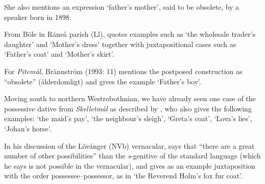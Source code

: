 She also mentions an expression  ‘father’s mother’, said to be obsolete, by a speaker born in 1898.


From Böle in Råneå parish (Ll), \citet[113]{Wikberg2004} quotes examples such as  ‘the wholesale trader’s daughter’ and  ‘Mother’s dress’ together with juxtapositional cases such as  ‘Father’s coat’ and  ‘Mother’s skirt’.


For \textit{Pitemål}, Brännström (1993: 11) mentions the postposed construction as “obsolete” (ålderdomligt) and gives the example  ‘Father’s boy’. 


Moving south to northern Westrobothnian, we have already seen one case of the possessive dative from \textit{Skelletmål} as described by \citet[22]{Marklund1976}, who also gives the following examples:  ‘the maid’s pay’,  ‘the neighbour’s sleigh’,  ‘Greta’s coat’,  ‘Lova’s lies’, ‘Johan’s horse’. 


In his discussion of the Lövånger (NVb) vernacular, \citet[208]{Holm1942} says that “there are a great number of other possibilities” than the \textit{s}{}-genitive of the standard language (which he says is not possible in the vernacular), and gives as an example juxtaposition with the order possessee–possessor, as in  ‘the Reverend Holm’s fox fur coat’. 

